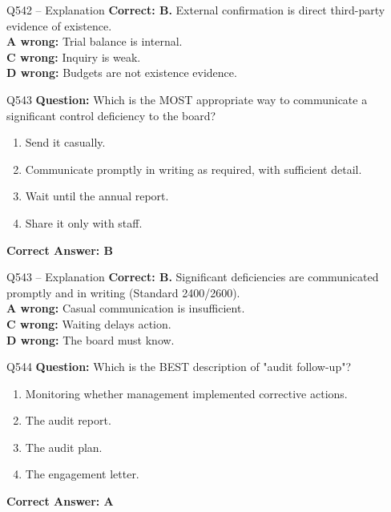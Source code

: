 \documentclass[aspectratio=169,10pt]{beamer}
\begin{document}
	\begin{frame}[t]{Q542 -- Explanation}
		\small
		\textbf{Correct: B.} External confirmation is direct third-party evidence of existence. \\[4pt]
		\textbf{A wrong:} Trial balance is internal. \\[2pt]
		\textbf{C wrong:} Inquiry is weak. \\[2pt]
		\textbf{D wrong:} Budgets are not existence evidence.
	\end{frame}
	
	\begin{frame}[t]{Q543}
		\small
		\textbf{Question:} Which is the MOST appropriate way to communicate a significant control deficiency to the board?
		\begin{enumerate}[label=\Alph*.,itemsep=1pt,topsep=2pt]
			\item Send it casually.
			\item Communicate promptly in writing as required, with sufficient detail.
			\item Wait until the annual report.
			\item Share it only with staff.
		\end{enumerate}
		\vspace{4pt}
		\textbf{Correct Answer: B}
	\end{frame}
	
	\begin{frame}[t]{Q543 -- Explanation}
		\small
		\textbf{Correct: B.} Significant deficiencies are communicated promptly and in writing (Standard 2400/2600). \\[4pt]
		\textbf{A wrong:} Casual communication is insufficient. \\[2pt]
		\textbf{C wrong:} Waiting delays action. \\[2pt]
		\textbf{D wrong:} The board must know.
	\end{frame}
	
	\begin{frame}[t]{Q544}
		\small
		\textbf{Question:} Which is the BEST description of "audit follow-up"?
		\begin{enumerate}[label=\Alph*.,itemsep=1pt,topsep=2pt]
			\item Monitoring whether management implemented corrective actions.
			\item The audit report.
			\item The audit plan.
			\item The engagement letter.
		\end{enumerate}
		\vspace{4pt}
		\textbf{Correct Answer: A}
	\end{frame}
	
\end{document}
